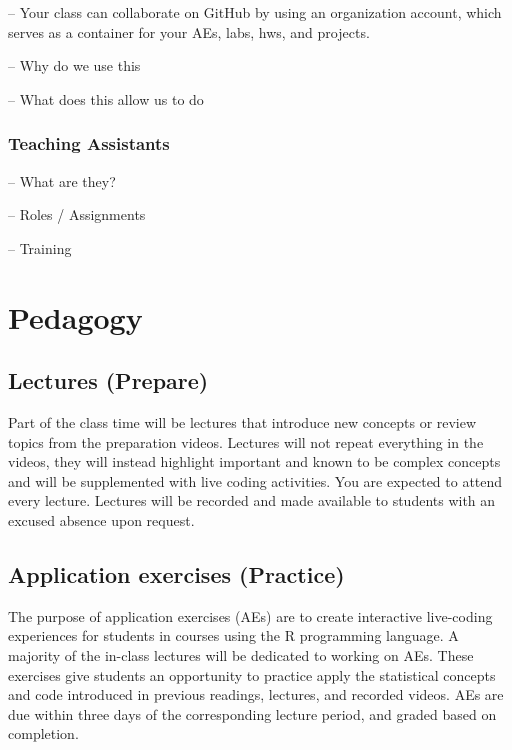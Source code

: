 \documentclass[
  12pt]{article}
\begin{document}
-- Your class can collaborate on GitHub by using an organization
account, which serves as a container for your AEs, labs, hws, and
projects.

-- Why do we use this

-- What does this allow us to do

\hypertarget{teaching-assistants}{%
\subsubsection{Teaching Assistants}\label{teaching-assistants}}

-- What are they?

-- Roles / Assignments

-- Training

\hypertarget{pedagogy}{%
\section{Pedagogy}\label{pedagogy}}

\hypertarget{lectures-prepare}{%
\subsection{Lectures (Prepare)}\label{lectures-prepare}}

Part of the class time will be lectures that introduce new concepts or
review topics from the preparation videos. Lectures will not repeat
everything in the videos, they will instead highlight important and
known to be complex concepts and will be supplemented with live coding
activities. You are expected to attend every lecture. Lectures will be
recorded and made available to students with an excused absence upon
request.

\hypertarget{application-exercises-practice}{%
\subsection{Application exercises
(Practice)}\label{application-exercises-practice}}

The purpose of application exercises (AEs) are to create interactive
live-coding experiences for students in courses using the R programming
language. A majority of the in-class lectures will be dedicated to
working on AEs. These exercises give students an opportunity to practice
apply the statistical concepts and code introduced in previous readings,
lectures, and recorded videos. AEs are due within three days of the
corresponding lecture period, and graded based on completion.
\end{document}
